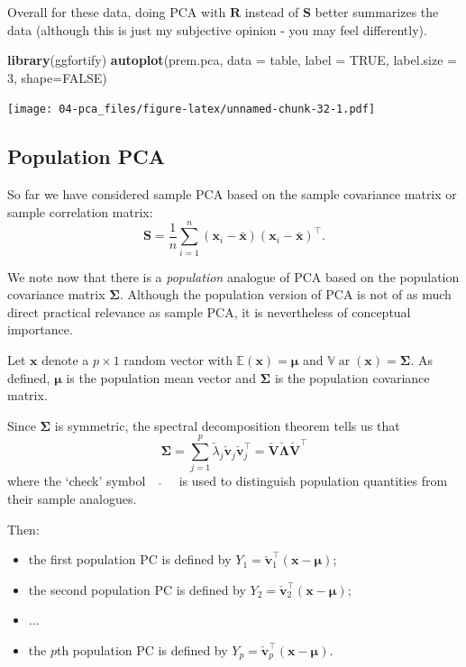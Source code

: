 \documentclass[]{book}
\newenvironment{Shaded}{\begin{snugshade}}{\end{snugshade}}
\newcommand{\DataTypeTok}[1]{\textcolor[rgb]{0.13,0.29,0.53}{#1}}
\newcommand{\DecValTok}[1]{\textcolor[rgb]{0.00,0.00,0.81}{#1}}
\newcommand{\KeywordTok}[1]{\textcolor[rgb]{0.13,0.29,0.53}{\textbf{#1}}}
\newcommand{\NormalTok}[1]{#1}
\newcommand{\OtherTok}[1]{\textcolor[rgb]{0.56,0.35,0.01}{#1}}
\providecommand{\tightlist}{%
  \setlength{\itemsep}{0pt}\setlength{\parskip}{0pt}}
\theoremstyle{definition}
\theoremstyle{definition}
\theoremstyle{definition}
\theoremstyle{remark}
\begin{document}
Overall for these data, doing PCA with \(\boldsymbol R\) instead of \(\boldsymbol S\) better summarizes the data (although this is just my subjective opinion - you may feel differently).

\begin{Shaded}
\begin{Highlighting}[]
\KeywordTok{library}\NormalTok{(ggfortify)}
\KeywordTok{autoplot}\NormalTok{(prem.pca, }\DataTypeTok{data =}\NormalTok{ table,  }\DataTypeTok{label =} \OtherTok{TRUE}\NormalTok{,  }\DataTypeTok{label.size =} \DecValTok{3}\NormalTok{, }\DataTypeTok{shape=}\OtherTok{FALSE}\NormalTok{)}
\end{Highlighting}
\end{Shaded}

\texttt{[image: 04-pca\_files/figure-latex/unnamed-chunk-32-1.pdf]}

\hypertarget{population-pca}{%
\subsection{Population PCA}\label{population-pca}}

So far we have considered sample PCA based on the sample covariance matrix or sample correlation matrix:
\[
\boldsymbol S=\frac{1}{n}\sum_{i=1}^n (\boldsymbol x_i-\bar{\boldsymbol x})(\boldsymbol x_i-\bar{\boldsymbol x})^\top.
\]

We note now that there is a \emph{population} analogue of PCA based on the population
covariance matrix \(\boldsymbol \Sigma\). Although the population version of PCA is not of as much direct practical
relevance as sample PCA, it is nevertheless of conceptual importance.

Let \(\boldsymbol x\) denote a \(p \times 1\) random vector with \({\mathbb{E}}(\boldsymbol x)={\pmb \mu}\) and \({\mathbb{V}\operatorname{ar}}(\boldsymbol x)={\pmb \Sigma}\). As defined,
\(\pmb \mu\) is the population mean vector and \(\pmb \Sigma\) is the population covariance matrix.

Since \(\pmb \Sigma\) is symmetric, the spectral decomposition theorem tells us that
\[
{\pmb \Sigma}=\sum_{j=1}^p \check{\lambda}_j \check{\boldsymbol v}_j \check{\boldsymbol v}_j^\top=\check{\boldsymbol V} \check{\boldsymbol \Lambda}\check{\boldsymbol V}^\top
\]
where the `check' symbol \(\quad \check{} \quad\) is used to distinguish population quantities from their sample analogues.

Then:

\begin{itemize}
\tightlist
\item
  the first population PC is defined by \(Y_1=\check{\boldsymbol v}_1^\top (\boldsymbol x-{\pmb \mu})\);
\item
  the second population PC is defined by \(Y_2=\check{\boldsymbol v}_2^\top (\boldsymbol x-{\pmb \mu})\);
\item
  \(\ldots\)
\item
  the \(p\)th population PC is defined by \(Y_p=\check{\boldsymbol v}_p^\top (\boldsymbol x-{\pmb \mu})\).
\end{itemize}
\end{document}
